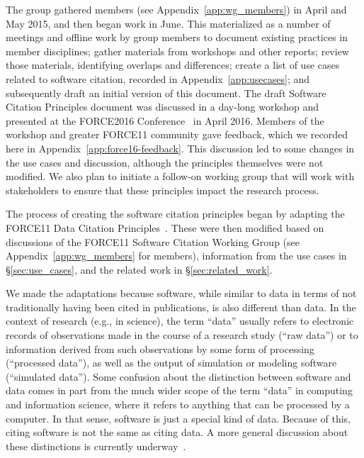 \documentclass[12pt, oneside]{amsart}
\begin{document}
The group gathered members (see Appendix~\ref{app:wg_members}) in April and
May 2015, and then began work in June. This materialized as a number of meetings
and offline work by group members to document existing
practices in member disciplines; gather materials from workshops and other
reports; review those materials, identifying overlaps and differences;
create a list of use cases related to software citation, recorded in
Appendix~\ref{app:usecases}; and subsequently draft an initial version of this document.
The draft Software Citation Principles document was discussed in a day-long
workshop and presented at the FORCE2016 Conference~\cite{force2016} in April 2016.
Members of the workshop and greater FORCE11 community gave feedback, which we
recorded here in Appendix~\ref{app:force16-feedback}. This discussion led to
some changes in the use cases and discussion, although the principles themselves
were not modified. We also plan to initiate a follow-on working group that will
work with stakeholders to ensure that these principles impact the research process.

The process of creating the software citation principles began by adapting
the FORCE11 Data Citation Principles~\cite{data-citation-principles}. These
were then modified based on discussions of the FORCE11 Software Citation
Working Group (see Appendix~\ref{app:wg_members} for members), information from
the use cases in \S\ref{sec:use_cases}, and the related work in
\S\ref{sec:related_work}.

We made the adaptations because software, while similar to data in terms of not
traditionally having been cited in publications, is also different than data.
In the context of research (e.g., in science), the term ``data'' usually refers
to electronic records of observations made in the course of a research study
(``raw data'') or to information derived from such observations by some form
of processing (``processed data''), as well as the output of simulation or
modeling software (``simulated data'').
Some confusion about the distinction between software and data comes in part
from the much wider scope of the term ``data'' in computing and
information science, where it refers to anything that can be processed by a
computer. In that sense, software is just a special kind of data.
Because of this, citing software is not the same as citing data. A more general
discussion about these distinctions is currently
underway~\cite{software-vs-data}.
\end{document}
